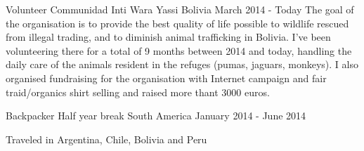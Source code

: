 

\begin{cventries}
  \cventry
    {Volunteer} %
    {Communidad Inti Wara Yassi} %
    {Bolivia} %
    {March 2014 - Today} %
    {
      The goal of the organisation is to provide the best quality of life possible to wildlife rescued from illegal trading, and to diminish animal trafficking in Bolivia.
I've been volunteering there for a total of 9 months between 2014 and today, handling the daily care of the animals resident in the refuges (pumas, jaguars, monkeys).
I also organised fundraising for the organisation with Internet campaign and fair traid/organics shirt selling and raised more thant 3000 euros.
    }

  \cventry
    {Backpacker} %
    {Half year break} %
    {South America} %
    {January 2014 - June 2014} %
    {
      \begin{cvitems} %
        \item {Traveled in Argentina, Chile, Bolivia and Peru}
      \end{cvitems}
    }
\end{cventries}
